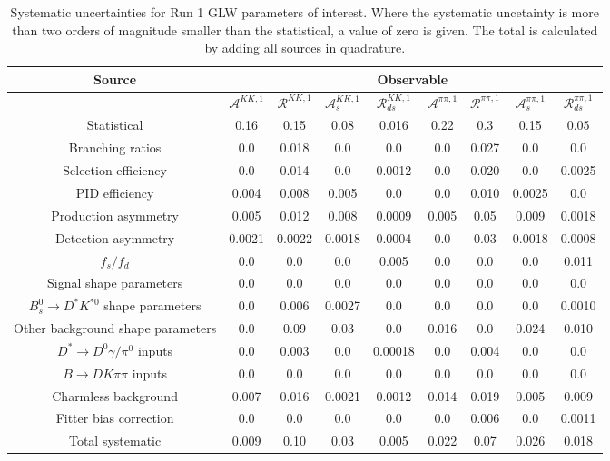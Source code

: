 \begin{sidewaystable}
  \centering
  \begin{tabular}{ccccccccc}
      \toprule
      Source & \multicolumn{8}{c}{Observable} \\
      \midrule
       & $\mathcal{A}^{KK,1}$ & $\mathcal{R}^{KK,1}$ & $\mathcal{A}_s^{KK,1}$ & $\mathcal{R}_{ds}^{KK,1}$ & $\mathcal{A}^{\pi\pi,1}$ & $\mathcal{R}^{\pi\pi,1}$ & $\mathcal{A}_s^{\pi\pi,1}$ & $\mathcal{R}_{ds}^{\pi\pi,1}$ \\
      \midrule
      Statistical & 0.16 & 0.15 & 0.08 & 0.016 & 0.22 & 0.3 & 0.15 & 0.05 \\
      \midrule
      Branching ratios & 0.0  & 0.018 & 0.0  & 0.0  & 0.0  & 0.027 & 0.0  & 0.0  \\
      Selection efficiency & 0.0  & 0.014 & 0.0  & 0.0012 & 0.0  & 0.020 & 0.0  & 0.0025 \\
      PID efficiency & 0.004 & 0.008 & 0.005 & 0.0  & 0.0  & 0.010 & 0.0025 & 0.0  \\
      Production asymmetry & 0.005 & 0.012 & 0.008 & 0.0009 & 0.005 & 0.05 & 0.009 & 0.0018 \\
      Detection asymmetry & 0.0021 & 0.0022 & 0.0018 & 0.0004 & 0.0  & 0.03 & 0.0018 & 0.0008 \\
      $f_s/f_d$ & 0.0  & 0.0  & 0.0  & 0.005 & 0.0  & 0.0  & 0.0  & 0.011 \\
      Signal shape parameters & 0.0  & 0.0  & 0.0  & 0.0  & 0.0  & 0.0  & 0.0  & 0.0  \\
      $B^0_s \to D^* K^{*0}$ shape parameters & 0.0  & 0.006 & 0.0027 & 0.0  & 0.0  & 0.0  & 0.0  & 0.0010 \\
      Other background shape parameters & 0.0  & 0.09 & 0.03 & 0.0  & 0.016 & 0.0  & 0.024 & 0.010 \\
      $D^* \to D^0 \gamma/\pi^0$ inputs & 0.0  & 0.003 & 0.0  & 0.00018 & 0.0  & 0.004 & 0.0  & 0.0  \\
      $B\to DK\pi\pi$ inputs & 0.0  & 0.0  & 0.0  & 0.0  & 0.0  & 0.0  & 0.0  & 0.0  \\
      Charmless background & 0.007 & 0.016 & 0.0021 & 0.0012 & 0.014 & 0.019 & 0.005 & 0.009 \\
      Fitter bias correction & 0.0  & 0.0  & 0.0  & 0.0  & 0.0  & 0.006 & 0.0  & 0.0011 \\
      \midrule
      Total systematic & 0.009 & 0.10 & 0.03 & 0.005 & 0.022 & 0.07 & 0.026 & 0.018 \\
      \bottomrule
  \end{tabular}
  \caption{Systematic uncertainties for Run 1 GLW parameters of interest. Where the systematic uncetainty is more than two orders of magnitude smaller than the statistical, a value of zero is given. The total is calculated by adding all sources in quadrature.}
\label{tab:KK_run1_systematics}
\end{sidewaystable}
